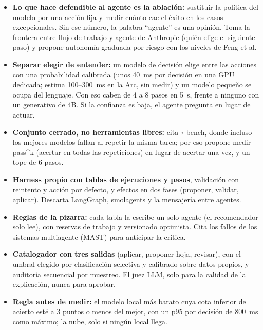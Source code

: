 \begin{tcolorbox}[colback=responsecolor, title=Insights de DeepSeek, colframe=gray!60!black, breakable]
	\begin{itemize}
		\item \textbf{Lo que hace defendible al agente es la ablación:} sustituir la política del modelo por una acción fija y medir cuánto cae el éxito en los casos excepcionales. Sin ese número, la palabra ``agente'' es una opinión. Toma la frontera entre flujo de trabajo y agente de Anthropic (quién elige el siguiente paso) y propone autonomía graduada por riesgo con los niveles de Feng et al.

		\item \textbf{Separar elegir de entender:} un modelo de decisión elige entre las acciones con una probabilidad calibrada (unos 40~ms por decisión en una GPU dedicada; estima 100--300~ms en la Arc, sin medir) y un modelo pequeño se ocupa del lenguaje. Con eso caben de 4 a 8 pasos en 5~s, frente a ninguno con un generativo de 4B. Si la confianza es baja, el agente pregunta en lugar de actuar.

		\item \textbf{Conjunto cerrado, no herramientas libres:} cita $\tau$-bench, donde incluso los mejores modelos fallan al repetir la misma tarea; por eso propone medir pass\textasciicircum{}k (acertar en todas las repeticiones) en lugar de acertar una vez, y un tope de 6 pasos.

		\item \textbf{Harness propio con tablas de ejecuciones y pasos}, validación con reintento y acción por defecto, y efectos en dos fases (proponer, validar, aplicar). Descarta LangGraph, smolagents y la mensajería entre agentes.

		\item \textbf{Reglas de la pizarra:} cada tabla la escribe un solo agente (el recomendador solo lee), con reservas de trabajo y versionado optimista. Cita los fallos de los sistemas multiagente (MAST) para anticipar la crítica.

		\item \textbf{Catalogador con tres salidas} (aplicar, proponer hoja, revisar), con el umbral elegido por clasificación selectiva y calibrado sobre datos propios, y auditoría secuencial por muestreo. El juez LLM, solo para la calidad de la explicación, nunca para aprobar.

		\item \textbf{Regla antes de medir:} el modelo local más barato cuya cota inferior de acierto esté a 3 puntos o menos del mejor, con un p95 por decisión de 800~ms como máximo; la nube, solo si ningún local llega.
	\end{itemize}
\end{tcolorbox}

